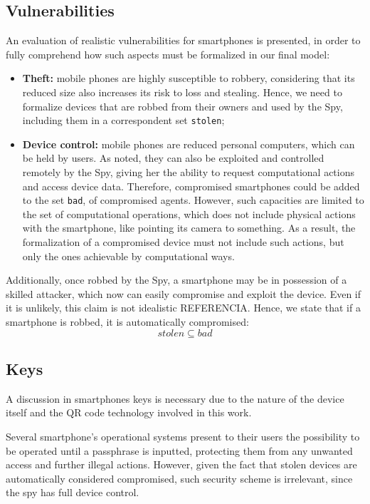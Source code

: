 \subsection{Vulnerabilities}
An evaluation of realistic vulnerabilities for smartphones is presented, in order to fully comprehend how such aspects must be formalized in our final model:

\begin{itemize}
  \item \textbf{Theft:} mobile phones are highly susceptible to robbery, considering that its reduced size also increases its risk to loss and stealing. Hence, we need to formalize devices that are robbed from their owners and used by the Spy, including them in a correspondent set \texttt{stolen};

  \item \textbf{Device control:} mobile phones are reduced personal computers, which can be held by users. As noted, they can also be exploited and controlled remotely by the Spy, giving her the ability to request computational actions and access device data. Therefore, compromised smartphones could be added to the set \texttt{bad}, of compromised agents. However, such capacities are limited to the set of computational operations, which does not include physical actions with the smartphone, like pointing its camera to something. As a result, the formalization of a compromised device must not include such actions, but only the ones achievable by computational ways.
\end{itemize}

Additionally, once robbed by the Spy, a smartphone may be in possession of a skilled attacker, which now can easily compromise and exploit the device. Even if it is unlikely, this claim is not idealistic {\color{blue} REFERENCIA}. Hence, we state that if a smartphone is robbed, it is automatically compromised:
%
$$stolen \subseteq bad$$





\subsection{Keys}
A discussion in smartphones keys is necessary due to the nature of the device itself and the QR code technology involved in this work.

Several smartphone's operational systems present to their users the possibility to be operated until a passphrase is inputted, protecting them from any unwanted access and further illegal actions. However, given the fact that stolen devices are automatically considered compromised, such security scheme is irrelevant, since the spy has full device control.

